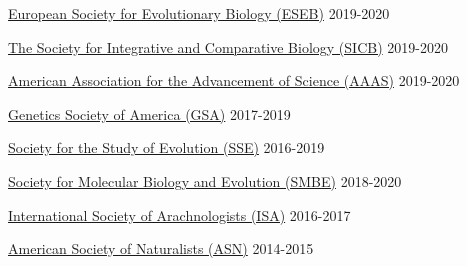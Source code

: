 

\begin{cvmemberships}

  \cvmembership
    {\href{https://eseb.org/}{European Society for Evolutionary Biology (ESEB)}}
    {}
    {2019-2020}
  
  \cvmembership
    {\href{http://www.sicb.org/}{The Society for Integrative and Comparative Biology (SICB)}} %
    {}   %
    {2019-2020} %
    
  \cvmembership
    {\href{https://www.aaas.org/}{American Association for the Advancement of Science (AAAS)}} %
    {} %
    {2019-2020} %

  \cvmembership
    {\href{https://genetics-gsa.org/}{Genetics Society of America (GSA)}} %
    {} %
    {2017-2019} %

  \cvmembership
    {\href{https://www.evolutionsociety.org/}{Society for the Study of Evolution (SSE)}} %
    {} %
    {2016-2019} %

  \cvmembership
    {\href{https://smbe.org/}{Society for Molecular Biology and Evolution (SMBE)}} %
    {} %
    {2018-2020} %
    
  \cvmembership
    {\href{https://arachnology.org/}{International Society of Arachnologists (ISA)}}
    {}
    {2016-2017}
    
  \cvmembership
     {\href{https://www.amnat.org/}{American Society of Naturalists (ASN)}}
     {}
     {2014-2015} 

\end{cvmemberships}
